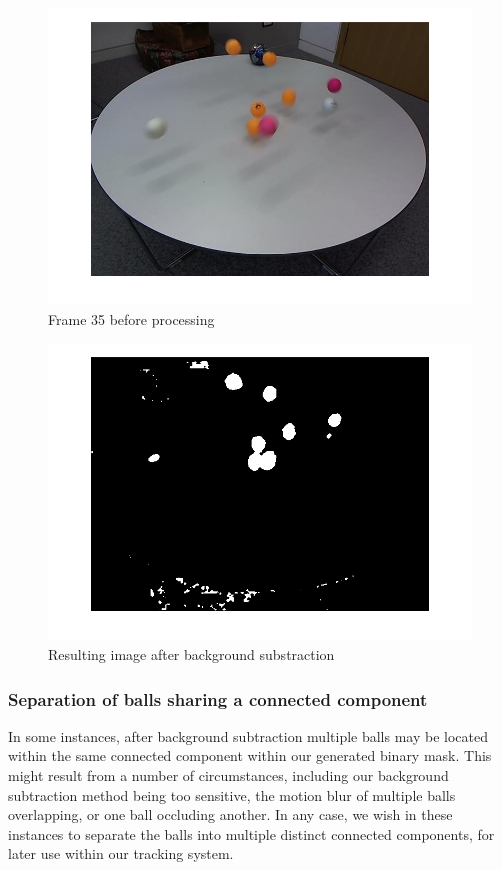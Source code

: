 \documentclass[12pt,a4paper]{article}
\begin{document}
\begin{figure}
	\centering
    \includegraphics[width=140mm]{frame_35_imgs/initial.png}
    \caption{Frame 35 before processing}
	\label{my-label02252}
\end{figure}

\begin{figure}
	\centering
    \includegraphics[width=140mm]{frame_35_imgs/background_sub.png}
    \caption{Resulting image after background substraction}
	\label{my-label0}
\end{figure}

\subsubsection{Separation of balls sharing a connected component}
In some instances, after background subtraction multiple balls may be located within the same connected component within our generated binary mask. This might result from a number of circumstances, including our background subtraction method being too sensitive, the motion blur of multiple balls overlapping, or one ball occluding another. In any case, we wish in these instances to separate the balls into multiple distinct connected components, for later use within our tracking system. 
\end{document}
